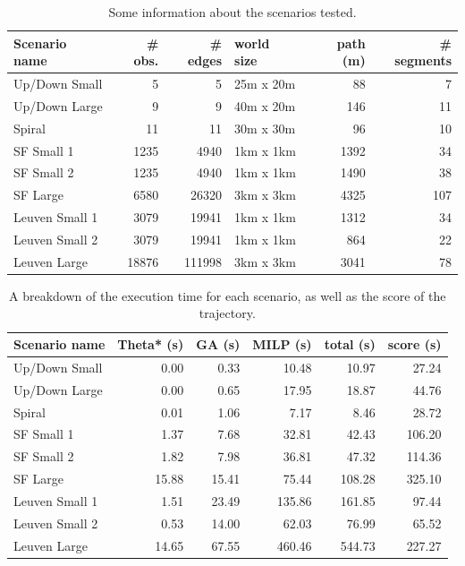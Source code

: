 \label{subsec:gen-perf}
\begin{table}[]
\centering
\begin{tabular}{ l | r | r  | l | r | r}
Scenario name & \# obs. & \# edges & world size & path (m) & \# segments \\
\hline
Up/Down Small 	& 5 	& 5 		& 25m x 20m 	& 88 	& 7   \\ 
Up/Down Large 	& 9 	& 9 		& 40m x 20m 	& 146 	& 11  \\
Spiral		 	& 11 	& 11 		& 30m x 30m 	& 96 	& 10  \\
SF Small 1		& 1235 	& 4940 		& 1km x 1km 	& 1392 	& 34  \\
SF Small 2		& 1235 	& 4940 		& 1km x 1km 	& 1490 	& 38  \\
SF Large	 	& 6580 	& 26320		& 3km x 3km 	& 4325 	& 107 \\
Leuven Small 1 	& 3079 	& 19941	 	& 1km x 1km 	& 1312 	& 34  \\
Leuven Small 2	& 3079 	& 19941		& 1km x 1km 	& 864 	& 22  \\
Leuven Large 	& 18876	& 111998 	& 3km x 3km 	& 3041 	& 78  \\
\end{tabular}
\caption{Some information about the scenarios tested.}
\label{table:gen-data}
\end{table}

\begin{table}[]
\centering
\begin{tabular}{ l | r | r | r | r || r}
Scenario name & Theta* (s) & GA (s) & MILP (s)  & total (s) & score (s) \\
\hline
Up/Down Small 	& 0.00 	& 0.33 	& 10.48 & 10.97 & 27.24	\\ 
Up/Down Large 	& 0.00 	& 0.65 	& 17.95 & 18.87 & 44.76	\\
Spiral		 	& 0.01 	& 1.06	& 7.17	& 8.46 	& 28.72	\\
SF Small 1		& 1.37 	& 7.68 	& 32.81 & 42.43 & 106.20\\
SF Small 2		& 1.82 	& 7.98	& 36.81 & 47.32 & 114.36\\
SF Large	 	& 15.88	& 15.41	& 75.44 & 108.28 & 325.10\\
Leuven Small 1 	& 1.51 	& 23.49	& 135.86& 161.85& 97.44	\\
Leuven Small 2	& 0.53 	& 14.00	& 62.03 & 76.99 & 65.52	\\
Leuven Large 	& 14.65	& 67.55	& 460.46 & 544.73 & 227.27\\
\end{tabular}
\caption{A breakdown of the execution time for each scenario, as well as the score of the trajectory.}
\label{table:gen-results}
\end{table}


